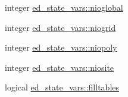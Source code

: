 \begin{DoxyCompactItemize}
\item 
integer \hyperlink{namespaceed__state__vars_ad27fcaec6a546cf46df5c40ddbf1bde1}{ed\+\_\+state\+\_\+vars\+::nioglobal}
\item 
integer \hyperlink{namespaceed__state__vars_ad3c5095a2e6e68fda8c698372a614a6e}{ed\+\_\+state\+\_\+vars\+::niogrid}
\item 
integer \hyperlink{namespaceed__state__vars_acc17e1323f7365a8a43c74ceb839eb10}{ed\+\_\+state\+\_\+vars\+::niopoly}
\item 
integer \hyperlink{namespaceed__state__vars_ad692c1e699708ecf209c08544c730efd}{ed\+\_\+state\+\_\+vars\+::niosite}
\item 
logical \hyperlink{namespaceed__state__vars_a5f3e4a557e76387c621a3dddd988ff01}{ed\+\_\+state\+\_\+vars\+::filltables}
\end{DoxyCompactItemize}
